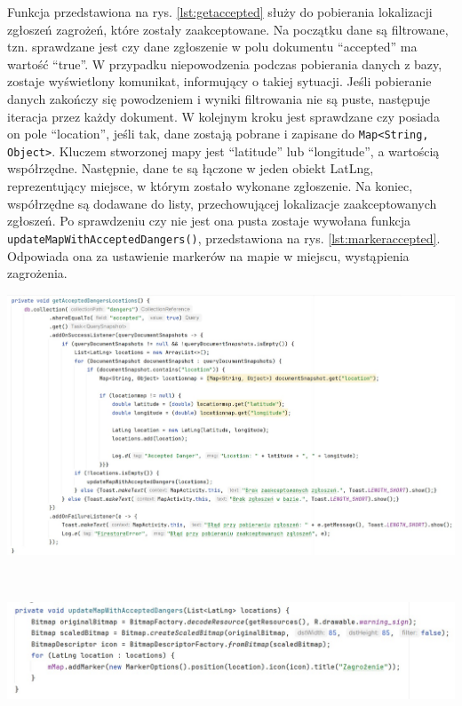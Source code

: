 Funkcja przedstawiona na rys. \ref{lst:getaccepted} służy do pobierania lokalizacji zgłoszeń zagrożeń, które zostały zaakceptowane. Na początku dane są filtrowane, tzn. sprawdzane jest czy dane zgłoszenie w polu dokumentu “accepted” ma wartość “true”. W przypadku niepowodzenia podczas pobierania danych z bazy, zostaje wyświetlony komunikat, informujący o takiej sytuacji. Jeśli pobieranie danych zakończy się powodzeniem i wyniki filtrowania nie są puste, następuje iteracja przez każdy dokument. W kolejnym kroku jest sprawdzane czy posiada on pole “location”, jeśli tak, dane zostają pobrane i zapisane do \verb|Map<String, Object>|. Kluczem stworzonej mapy jest “latitude” lub “longitude”, a wartością współrzędne. Następnie, dane te są łączone w jeden obiekt LatLng, reprezentujący miejsce, w którym zostało wykonane zgłoszenie. Na koniec, współrzędne są dodawane do listy, przechowującej lokalizacje zaakceptowanych zgłoszeń. Po sprawdzeniu czy nie jest ona pusta zostaje wywołana funkcja \verb|updateMapWithAcceptedDangers()|, przedstawiona na rys. \ref{lst:markeraccepted}. Odpowiada ona za ustawienie markerów na mapie w miejscu, wystąpienia zagrożenia. \\

\noindent
\begin{minipage}{\linewidth}
    \label{lst:getaccepted}
    \centering
    \includegraphics[width=0.8\linewidth]{img/kod/imp-getacceptedloc.jpg}
\end{minipage}
\\

\noindent
\begin{minipage}{\linewidth}
    \label{lst:markeraccepted}
    \centering
    \includegraphics[width=0.8\linewidth]{img/kod/imp-updatemap.jpg}
\end{minipage}
\\
